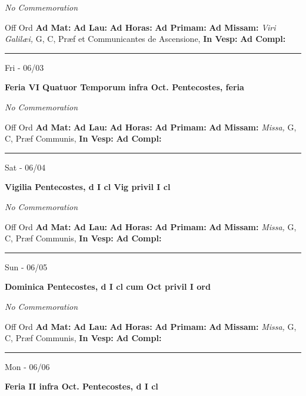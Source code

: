 \documentclass[letterpaper, 10pt]{article}
\begin{document}
\textit{No Commemoration}\begin{justify}
Off Ord
\textbf{Ad Mat: }
\textbf{Ad Lau: }
\textbf{Ad Horas: }
\textbf{Ad Primam: }
\textbf{Ad Missam:} \textit{Viri Galilæi, } G, C, Præf et Communicantes de Ascensione, 
\textbf{In Vesp: }
\textbf{Ad Compl: }\end{justify}



\hrule
\begin{center}
Fri - 06/03
\end{center}\textbf{ \large Feria VI Quatuor Temporum infra Oct. Pentecostes, \textnormal{\normalsize feria}}

\textit{No Commemoration}\begin{justify}
Off Ord
\textbf{Ad Mat: }
\textbf{Ad Lau: }
\textbf{Ad Horas: }
\textbf{Ad Primam: }
\textbf{Ad Missam:} \textit{Missa, } G, C, Præf Communis, 
\textbf{In Vesp: }
\textbf{Ad Compl: }\end{justify}



\hrule
\begin{center}
Sat - 06/04
\end{center}\textbf{ \large Vigilia Pentecostes, \textnormal{\normalsize d I cl Vig privil I cl}}

\textit{No Commemoration}\begin{justify}
Off Ord
\textbf{Ad Mat: }
\textbf{Ad Lau: }
\textbf{Ad Horas: }
\textbf{Ad Primam: }
\textbf{Ad Missam:} \textit{Missa, } G, C, Præf Communis, 
\textbf{In Vesp: }
\textbf{Ad Compl: }\end{justify}



\hrule
\begin{center}
Sun - 06/05
\end{center}\textbf{ \large Dominica Pentecostes, \textnormal{\normalsize d I cl cum Oct privil I ord}}

\textit{No Commemoration}\begin{justify}
Off Ord
\textbf{Ad Mat: }
\textbf{Ad Lau: }
\textbf{Ad Horas: }
\textbf{Ad Primam: }
\textbf{Ad Missam:} \textit{Missa, } G, C, Præf Communis, 
\textbf{In Vesp: }
\textbf{Ad Compl: }\end{justify}



\hrule
\begin{center}
Mon - 06/06
\end{center}\textbf{ \large Feria II infra Oct. Pentecostes, \textnormal{\normalsize d I cl}}
\end{document}
